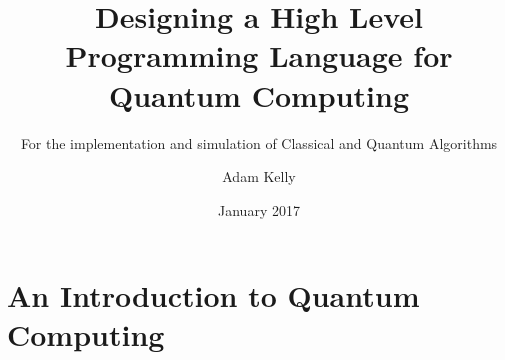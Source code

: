 \documentclass{scrartcl}
\title{Designing a High Level Programming Language for Quantum Computing}
\subtitle{For the implementation and simulation of Classical and Quantum Algorithms}
\author{Adam Kelly}
\date{January 2017}
\begin{document}
\begin{titlepage}
\maketitle
\end{titlepage}

\newpage
\tableofcontents
\newpage
 
\section{An Introduction to Quantum Computing}

 
\newpage
\printbibliography
\end{document}
